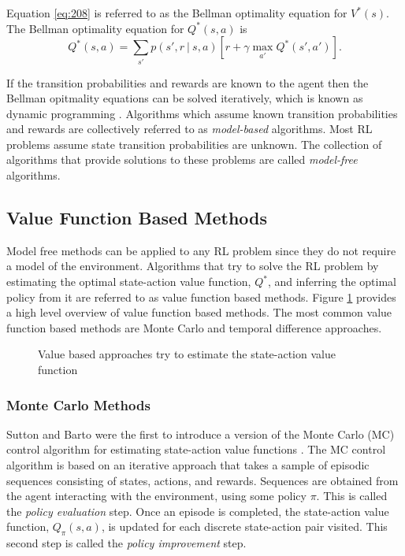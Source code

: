 Equation \ref{eq:208} is referred to as the Bellman optimality equation for $V^*(s)$. The Bellman optimality equation for $Q^*(s,a)$ is
\begin{equation}
	Q^*(s,a) = \sum_{s'} p(s', r \ | \ s, a)[r + \gamma \max_{a'} Q^*(s',a')]. \label{eq:209}
\end{equation}

If the transition probabilities and rewards are known to the agent then the Bellman opitmality equations can be solved iteratively, which is known as dynamic programming \cite{Bellm1957}. Algorithms which assume known transition probabilities and rewards are collectively referred to as \textit{model-based} algorithms. Most RL problems assume state transition probabilities are unknown. The collection of algorithms that provide solutions to these problems are called \textit{model-free} algorithms.


\subsection{Value Function Based Methods}
Model free methods can be applied to any RL problem since they do not require a model of the environment. Algorithms that try to solve the RL problem by estimating the optimal state-action value function, $Q^*$, and inferring the optimal policy from it are referred to as value function based methods. Figure \ref{fig:211_families_of_RL_algorithms} provides a high level overview of value function based methods. The most common value function based methods are Monte Carlo and temporal difference approaches.

\begin{figure}[h]
	\centering
	\resizebox{\textwidth}{!}{}
	\caption[RL approaches: Value Based]{Value based approaches try to estimate the state-action value function}
	\label{fig:211_families_of_RL_algorithms}
\end{figure}


\subsubsection{Monte Carlo Methods}
Sutton and Barto were the first to introduce a version of the Monte Carlo (MC) control algorithm for estimating state-action value functions \cite{Sutton2018}. The MC control algorithm is based on an iterative approach that takes a sample of episodic sequences consisting of states, actions, and rewards. Sequences are obtained from the agent interacting with the environment, using some policy $\pi$. This is called the \textit{policy evaluation} step. Once an episode is completed, the state-action value function, $Q_{\pi}(s,a)$, is updated for each discrete state-action pair visited. This second step is called the \textit{policy improvement} step.

